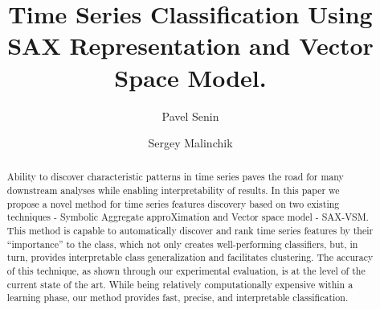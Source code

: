 \documentclass{llncs}
\begin{document}
%
\mainmatter              %
%
\title{Time Series Classification Using SAX Representation and Vector Space Model.}
%
%
\author{Pavel Senin
\and Sergey Malinchik
}
%
%
%


\maketitle              %

\begin{abstract}
Ability to discover characteristic patterns in time series paves the road for many
downstream analyses while enabling interpretability of results. 
In this paper we propose a novel method for time series features discovery based on two existing
techniques - Symbolic Aggregate approXimation and Vector space model - SAX-VSM. 
This method is capable to automatically discover and rank time series features by their
“importance” to the class, which not only creates well-performing classifiers, but, in turn,
provides interpretable class generalization and facilitates clustering. The accuracy of this
technique, as shown  through our experimental evaluation, is at the level of the current state of
the art.  
While being relatively computationally expensive within a learning phase, our method provides fast,
precise, and interpretable classification.
\end{abstract}
%
\end{document}
